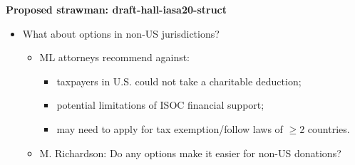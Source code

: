 \documentclass[helvetica]{seminar}
\newcommand{\heading}[1]{%
  \begin{center} 
    \large\bf 
    #1 
  \end{center} 
  \vspace{.4 in}}
\begin{document}
\begin{slide}

\heading{Proposed strawman: draft-hall-iasa20-struct}

\begin{itemize}
\item What about options in non-US jurisdictions?
  \begin{itemize}
  \item ML attorneys recommend against:
    \begin{itemize}
    \item taxpayers in U.S. could not take a charitable deduction;
    \item potential limitations of ISOC financial support; 
    \item may need to apply for tax exemption/follow laws of $\geq2$
      countries.
    \end{itemize}
  \item M. Richardson: Do any options make it easier for non-US
    donations?
  \end{itemize}
\end{itemize}

\end{slide}
\end{document}
